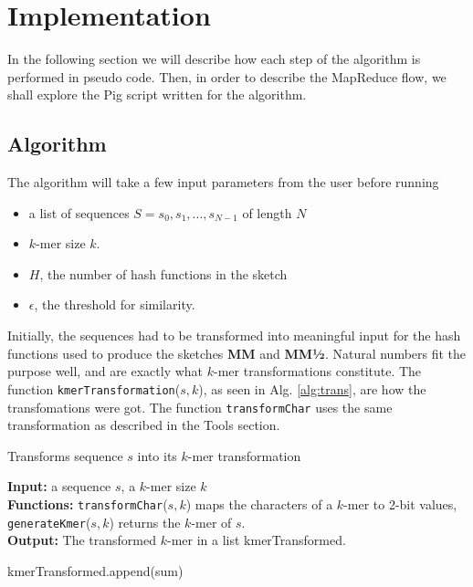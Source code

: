 \documentclass[../../main.tex]{subfiles}
\begin{document}
\section{Implementation}

In the following section we will describe how each step of the algorithm is performed in pseudo code. Then, in order to describe the MapReduce flow, we shall explore the Pig script written for the algorithm.


\subsection{Algorithm}
The algorithm will take a few input parameters from the user before running
\begin{itemize}
\item a list of sequences $S={s_0,s_1,...,s_{N-1}}$ of length $N$
\item $k$-mer size $k$.
\item $H$, the number of hash functions in the sketch
\item $\epsilon$, the threshold for similarity.  
\end{itemize}

Initially, the sequences had to be  transformed into meaningful input for the hash functions used to produce the sketches {\bf MM} and {\bf MM½}. Natural numbers fit the purpose well, and are exactly what $k$-mer transformations constitute. The function \texttt{kmerTransformation}($s,k$), as seen in Alg. \ref{alg:trans}, are how the transfomations were got. The function \texttt{transformChar} uses the same transformation as described in the Tools section. 

\begin{algorithm}
\caption{Transforms sequence $s$ into its $k$-mer transformation}\label{alg:trans}
\textbf{Input:} a sequence $s$, a $k$-mer size $k$\\
\textbf{Functions:} \texttt{transformChar}($s,k$) maps the characters of a $k$-mer to 2-bit values, \texttt{generateKmer}($s,k$) returns the $k$-mer of $s$.\\
\textbf{Output:} The transformed $k$-mer in a list kmerTransformed.
\begin{algorithmic}[1]
\Statex
{}
	
	 
		\EndFor
		\State kmerTransformed.append(sum)
	\EndFor
\State {}
\EndFunction
\end{algorithmic}
\end{algorithm}
\end{document}
